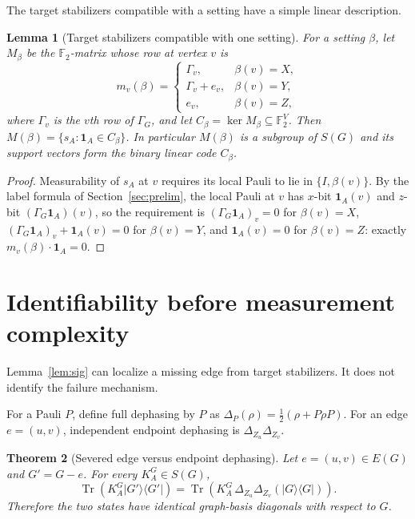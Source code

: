 \documentclass[11pt]{article}
\newtheorem{theorem}{Theorem}[section]
\newtheorem{lemma}[theorem]{Lemma}
\theoremstyle{remark}
\newcommand{\F}{\mathbb{F}}
\newcommand{\SG}{S(G)}
\newcommand{\Tr}{\operatorname{Tr}}
\begin{document}
The target stabilizers compatible with a setting have a simple linear description.

\begin{lemma}[Target stabilizers compatible with one setting]\label{lem:code}
For a setting $\beta$, let $M_\beta$ be the $\F_2$-matrix whose row at vertex $v$ is
\[
 m_v(\beta)=
\begin{cases}
\Gamma_v,& \beta(v)=X,\\
\Gamma_v+e_v,& \beta(v)=Y,\\
e_v,& \beta(v)=Z,
\end{cases}
\]
where $\Gamma_v$ is the $v$th row of $\Gamma_G$, and let $C_\beta=\ker M_\beta\subseteq\F_2^V$. Then $M(\beta)=\{s_A:\mathbf 1_A\in C_\beta\}$. In particular $M(\beta)$ is a subgroup of $\SG$ and its support vectors form the binary linear code $C_\beta$.
\end{lemma}

\begin{proof}
Measurability of $s_A$ at $v$ requires its local Pauli to lie in $\{I,\beta(v)\}$. By the label formula of Section~\ref{sec:prelim}, the local Pauli at $v$ has $x$-bit $\mathbf 1_A(v)$ and $z$-bit $(\Gamma_G\mathbf 1_A)(v)$, so the requirement is $(\Gamma_G\mathbf 1_A)_v=0$ for $\beta(v)=X$, $(\Gamma_G\mathbf 1_A)_v+\mathbf 1_A(v)=0$ for $\beta(v)=Y$, and $\mathbf 1_A(v)=0$ for $\beta(v)=Z$: exactly $m_v(\beta)\cdot\mathbf 1_A=0$.
\end{proof}
\section{Identifiability before measurement complexity}\label{sec:ident}
Lemma~\ref{lem:sig} can localize a missing edge from target stabilizers.  It does not identify the failure mechanism.

For a Pauli $P$, define full dephasing by $P$ as $\Delta_P(\rho)=\frac12(\rho+P\rho P)$. For an edge $e=(u,v)$, independent endpoint dephasing is $\Delta_{Z_u}\Delta_{Z_v}$.

\begin{theorem}[Severed edge versus endpoint dephasing]\label{thm:keystone}
Let $e=(u,v)\in E(G)$ and $G'=G-e$. For every $K_A^G\in S(G)$,
\[
\Tr\!\left(K_A^G |G'\rangle\langle G'|\right)
=
\Tr\!\left(K_A^G\,\Delta_{Z_u}\Delta_{Z_v}(|G\rangle\langle G|)\right).
\]
Therefore the two states have identical graph-basis diagonals with respect to $G$.
\end{theorem}
\end{document}
